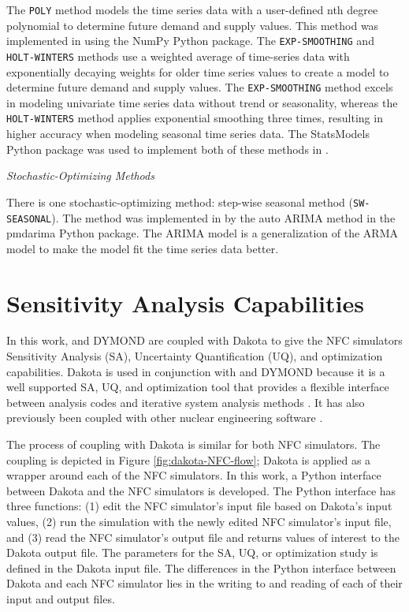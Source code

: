 The \texttt{POLY} method models the time series data 
with a user-defined nth degree polynomial to determine 
future demand and supply values. 
This method was implemented in \deploy using the 
NumPy \cite{developers_numpy_2013} Python package. 
The \texttt{EXP-SMOOTHING} and \texttt{HOLT-WINTERS} 
methods use a weighted average 
of time-series data with exponentially decaying weights 
for older time series values \cite{hyndman_forecasting:_2018}
to create a model to determine future demand and supply values. 
The \texttt{EXP-SMOOTHING} method excels in 
modeling univariate time series data without trend or seasonality, 
whereas the \texttt{HOLT-WINTERS} method applies exponential 
smoothing three times, resulting in higher accuracy when 
modeling seasonal time series data. 
The StatsModels \cite{github_community_statsmodels:_2019}
Python package was used to implement both of these methods 
in \deploy. 

\noindent
\textit{Stochastic-Optimizing Methods}

There is one stochastic-optimizing method: step-wise 
seasonal method (\texttt{SW-SEASONAL}). 
The method was implemented in \deploy by the auto \gls{ARIMA} 
method in the pmdarima \cite{noauthor_pmdarima:_2019}
Python package. 
The \gls{ARIMA} model is a generalization of the \gls{ARMA}
model to make the model fit the time series data better. 

\section{Sensitivity Analysis Capabilities}
In this work, \Cyclus and DYMOND are coupled with Dakota 
\cite{eldred_dakota_2010} to give the \gls{NFC} simulators 
Sensitivity Analysis (\gls{SA}), 
Uncertainty Quantification (\gls{UQ}), and optimization capabilities. 
Dakota is used in conjunction with \Cyclus and DYMOND because it 
is a well supported \gls{SA}, \gls{UQ}, 
and optimization tool that provides a flexible interface between 
analysis codes and iterative system analysis methods 
\cite{turner_virtual_nodate}. 
It has also previously been coupled with other nuclear engineering 
software \cite{turner_virtual_nodate,zhang_uncertainty_nodate}. 

The process of coupling with Dakota is similar 
for both \gls{NFC} simulators. 
The coupling is depicted in Figure \ref{fig:dakota-NFC-flow}; 
Dakota is applied as a wrapper around each of the \gls{NFC} simulators. 
In this work, a Python interface between Dakota and the \gls{NFC} simulators
is developed. 
The Python interface has three functions: 
(1) edit the \gls{NFC} simulator's input file based on Dakota's input values, 
(2) run the simulation with the newly edited \gls{NFC} simulator's input file, and 
(3) read the \gls{NFC} simulator's output file and returns values of interest 
to the Dakota output file. 
The parameters for the \gls{SA}, \gls{UQ}, or optimization study 
is defined in the Dakota input file. 
The differences in the Python interface between Dakota and each 
\gls{NFC} simulator lies in the writing to and reading of 
each of their input and output files. 

